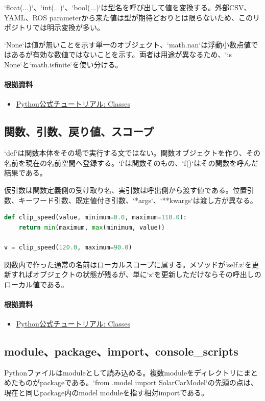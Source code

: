\documentclass[a4paper,11pt]{article}
\begin{document}
`float(...)`、`int(...)`、`bool(...)`は型名を呼び出して値を変換する。外部CSV、YAML、ROS parameterから来た値は型が期待どおりとは限らないため、このリポジトリでは明示変換が多い。


`None`は値が無いことを示す単一のオブジェクト、`math.nan`は浮動小数点値ではあるが有効な数値ではないことを示す。両者は用途が異なるため、`is None`と`math.isfinite`を使い分ける。

\paragraph{根拠資料}
\begin{itemize}[leftmargin=1.6em]
\item \href{https://docs.python.org/3/tutorial/classes.html}{Python公式チュートリアル: Classes}
\end{itemize}

\subsection{関数、引数、戻り値、スコープ}
`def`は関数本体をその場で実行する文ではない。関数オブジェクトを作り、その名前を現在の名前空間へ登録する。`f`は関数そのもの、`f()`はその関数を呼んだ結果である。


仮引数は関数定義側の受け取り名、実引数は呼出側から渡す値である。位置引数、キーワード引数、既定値付き引数、`*args`、`**kwargs`は渡し方が異なる。


\begin{lstlisting}[language=python]
def clip_speed(value, minimum=0.0, maximum=110.0):
    return min(maximum, max(minimum, value))

v = clip_speed(120.0, maximum=90.0)
\end{lstlisting}


関数内で作った通常の名前はローカルスコープに属する。メソッドが`self.z`を更新すればオブジェクトの状態が残るが、単に`z`を更新しただけならその呼出しのローカル値である。

\paragraph{根拠資料}
\begin{itemize}[leftmargin=1.6em]
\item \href{https://docs.python.org/3/tutorial/classes.html}{Python公式チュートリアル: Classes}
\end{itemize}

\subsection{module、package、import、console\_scripts}
Pythonファイルはmoduleとして読み込める。複数moduleをディレクトリにまとめたものがpackageである。`from .model import SolarCarModel`の先頭の点は、現在と同じpackage内のmodel moduleを指す相対importである。
\end{document}
